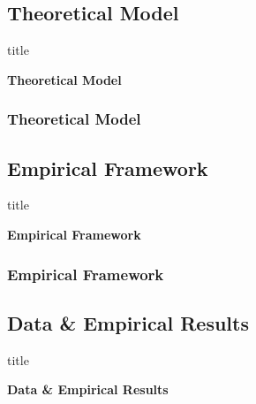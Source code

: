 \documentclass[11pt]{beamer}
\begin{document}
\begin{frame}
	\section[Theoretical]{Theoretical Model}
	
	\begin{beamercolorbox}{title}
		\begin{center}
			\bfseries \huge Theoretical Model
		\end{center}
	\end{beamercolorbox}

\end{frame}

\begin{frame}
	\frametitle{\bfseries Theoretical Model}
	
	
\end{frame}
\begin{frame}
	\section[Framework]{Empirical Framework}
	
	\begin{beamercolorbox}{title}
		\begin{center}
			\bfseries \huge Empirical Framework
		\end{center}	
	\end{beamercolorbox}
	
\end{frame}

\begin{frame}

	\frametitle{\bfseries Empirical Framework}
\end{frame}
\begin{frame}
	\section[Data \& Results]{Data \& Empirical Results}
	
	\begin{beamercolorbox}{title}
		\begin{center}
			\bfseries \huge Data \& Empirical Results
		\end{center}	
	\end{beamercolorbox}
	
\end{frame}
\end{document}
